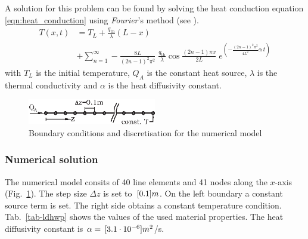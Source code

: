 A solution for this problem can be found by solving the heat conduction equation \eqref{eqn:heat_conduction} using \textit{Fourier}'s method (see \cite{HaeSamVoi:92}).
\begin{equation}
\begin{split}
T(x,t) & = T_L + \frac{q_{\mathrm{th}}}{\lambda}(L-x) \\
& + 
\sum_{n=1}^{\infty} - \frac{8L}{(2n-1)^2\pi^2}\;\frac{q_{\mathrm{th}}}{\lambda} \cos{\frac{(2n-1)\pi x}{2L}}\;e^{(-\frac{(2n-1)^2\pi^2}{4L^2}\alpha\,t)}
\label{eqn:lhdw}
\end{split}
\end{equation}
with $T_L$ is the initial temperature, $Q_A$ is the constant heat source, $\lambda$ is the thermal conductivity and $\alpha$ is the heat diffusivity constant.

\begin{figure}[!htbp]
\centering
\includegraphics[width=0.5\textwidth]{PART_II/T/ms-lhdw.eps}
\caption{\label{fig-mslhdw}Boundary conditions and discretisation for the numerical model}
\end{figure}

\subsubsection{Numerical solution}

The numerical model consits of 40 line elements and 41 nodes along the $x$-axis (Fig.~\ref{fig-mslhdw}). The step size $\Delta z$ is set to $\, \mathrm{[}0.1]{m}$. On the left boundary a constant source term is set. The right side obtains a constant temperature condition.
%
Tab.~\ref{tab-ldhwp} shows the values of the used material properties. The heat diffusivity constant is $\alpha = \, \mathrm{[}3.1 \cdot 10 ^{-6}]{m^{2}}$/s. 

